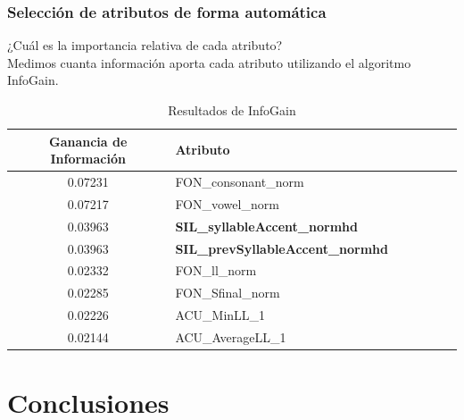 \documentclass[mathserif]{beamer}%
\begin{document}
\begin{frame}
	\frametitle{Selección de atributos de forma automática}
		
	¿Cuál es la importancia relativa de cada atributo?	\\
	Medimos cuanta información aporta cada atributo utilizando el algoritmo InfoGain.
	\begin{table}[H]
		\centering
		\begin{tabular}{|c|l|c|c|c|c|c|}
			\hline
			\textbf{Ganancia de Información} & \textbf{Atributo} \\ \hline
			0.07231     & FON\_consonant\_norm \\ \hline
			0.07217     & FON\_vowel\_norm \\ \hline
			0.03963     & \textbf{SIL\_syllableAccent\_normhd }\\ \hline
			0.03963     & \textbf{SIL\_prevSyllableAccent\_normhd} \\ \hline
			0.02332     & FON\_ll\_norm \\ \hline
			0.02285     & FON\_Sfinal\_norm \\ \hline
			0.02226     & ACU\_MinLL\_1 \\ \hline
			0.02144     & ACU\_AverageLL\_1 \\ \hline
		\end{tabular}
		\caption{Resultados de InfoGain}
		\label{infogain-table}
	\end{table}
\end{frame}

\section{Conclusiones}
\end{document}
